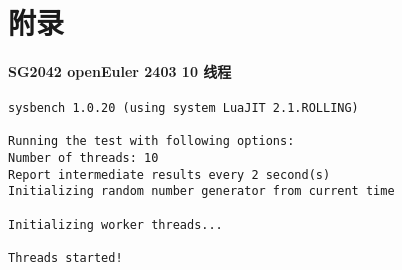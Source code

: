 \documentclass{article}
\begin{document}
\newpage
\appendix

\section{附录}

\paragraph{SG2042 openEuler 2403 10 线程}

\begin{verbatim}
sysbench 1.0.20 (using system LuaJIT 2.1.ROLLING)

Running the test with following options:
Number of threads: 10
Report intermediate results every 2 second(s)
Initializing random number generator from current time

Initializing worker threads...

Threads started!


\end{verbatim}
\end{document}
